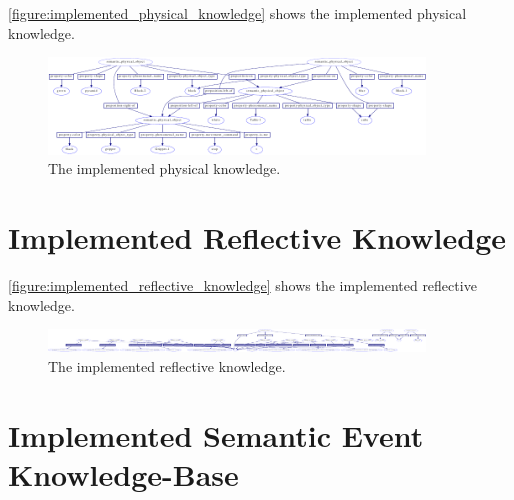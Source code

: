 {\mbox{\autoref{figure:implemented_physical_knowledge}}} shows the
implemented physical knowledge.
\begin{figure}
\includegraphics[width=10cm]{gfx/implemented_physical_knowledge}
\caption[The implemented physical knowledge.]{The implemented physical
  knowledge.}
\label{figure:implemented_physical_knowledge}
\end{figure}

\section{Implemented Reflective Knowledge}

{\mbox{\autoref{figure:implemented_reflective_knowledge}}} shows the
implemented reflective knowledge.
\begin{figure}
\includegraphics[width=10cm]{gfx/implemented_reflective_knowledge}
\caption[The implemented reflective knowledge.]{The implemented
  reflective knowledge.}
\label{figure:implemented_reflective_knowledge}
\end{figure}

\section{Implemented Semantic Event Knowledge-Base}

